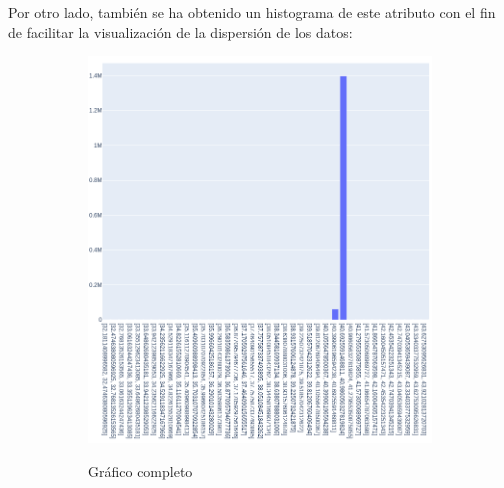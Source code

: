 \documentclass[12pt]{article}
\begin{document}
\begin{itemize}
Por otro lado, también se ha obtenido un histograma de este atributo con el fin de facilitar la visualización de la dispersión de los datos:

\begin{figure}[H]
    \centering
    \begin{subfigure}{0.5\textwidth}
        \centering
        \includegraphics[width=1\textwidth]{dropoff_latitude.PNG}
        \label{fig:sub_dropoff_latitude}
        \caption{Gráfico completo}
    \end{subfigure}%
    \begin{subfigure}{0.5\textwidth}
        \centering

\end{subfigure}
\end{figure}
\end{itemize}
\end{document}
